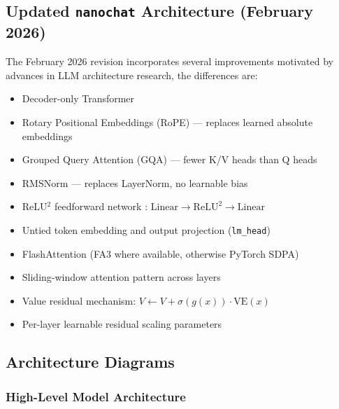 \documentclass[a4paper,12pt]{article}
\begin{document}
\subsection{Updated \texttt{nanochat} Architecture (February 2026)}

The February 2026 revision incorporates several improvements motivated by advances in LLM architecture research, the differences are:

\begin{itemize}
    \item Decoder-only Transformer
    \item Rotary Positional Embeddings (RoPE) \cite{su2024roformer} — replaces learned absolute embeddings
    \item Grouped Query Attention (GQA) \cite{ainslie2023gqa} — fewer K/V heads than Q heads
    \item RMSNorm \cite{zhang2019root} — replaces LayerNorm, no learnable bias
    \item ReLU$^2$ feedforward network \cite{so2022primer}: $\text{Linear} \rightarrow \text{ReLU}^2 \rightarrow \text{Linear}$
    \item Untied token embedding and output projection (\texttt{lm\_head})
    \item FlashAttention (FA3 where available, otherwise PyTorch SDPA) \cite{dao2023flashattention2}
    \item Sliding-window attention pattern across layers \cite{beltagy2020longformer}
    \item Value residual mechanism: $V \leftarrow V + \sigma(g(x)) \cdot \mathrm{VE}(x)$
    \item Per-layer learnable residual scaling parameters
\end{itemize}

\subsection{Architecture Diagrams}

\subsubsection{High-Level Model Architecture}
\end{document}
